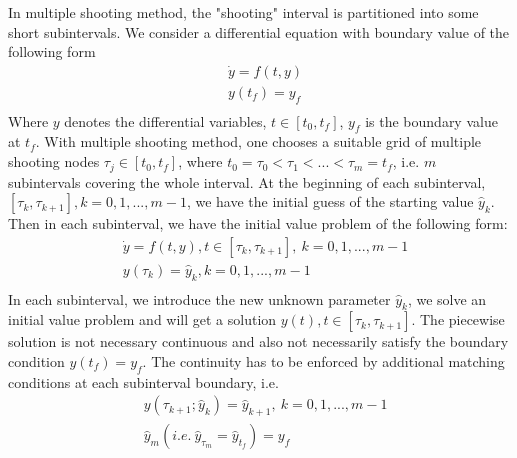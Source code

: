 \documentclass  [
  paper    = a4,
  BCOR     = 10mm,
  twoside,
  fontsize = 12pt,
  fleqn,
  toc      = bibnumbered,
  toc      = listofnumbered,
  numbers  = noendperiod,
  headings = normal,
  listof   = leveldown,
  version  = 3.03
]                                       {scrreprt}
\newcommand{\<}{\langle}
\renewcommand{\>}{\rangle}
\begin{document}
In multiple shooting method, the "shooting" interval is partitioned into some short subintervals. We consider a differential equation with boundary value of the following form
\begin{equation}\label{eqn:ori_dae}
	\begin{aligned}
		& \dot{y} = f(t, y) \\ 
		& y(t_f) = y_f  \\
	\end{aligned}
\end{equation}
Where $y$ denotes the differential variables, $t \in [t_0, t_f]$, $y_f$ is the boundary value at $t_f$. With multiple shooting method, one chooses a suitable grid of multiple shooting nodes $\tau_j \in [t_0,t_f] $, where $t_0 = \tau_0 < \tau_1 < ... < \tau_m = t_f$, i.e. $m$ subintervals covering the whole interval. At the beginning of each subinterval, $[\tau_k, \tau_{k+1}], k = 0, 1, ..., m-1$, we have the initial guess of the starting value $\hat{y}_k$. Then in each subinterval, we have the initial value problem of the following form: 
\begin{equation}\label{eqn:msh}
	\begin{aligned}
		& \dot{y} = f(t, y) , t \in [\tau_k, \tau_{k+1}], \ k = 0, 1, ..., m-1   \\ 
		& y(\tau_k) = \hat{y}_k, k = 0, 1, ..., m-1  \\
	\end{aligned}
\end{equation}
In each subinterval, we introduce the new unknown parameter $\hat{y}_k$, we solve an initial value problem and will get a solution $y(t), t \in [\tau_k, \tau_{k+1}]$. The piecewise solution is not necessary continuous and also not necessarily satisfy the boundary condition $y(t_f) = y_f$. The continuity has to be enforced by additional matching conditions at each subinterval boundary, i.e. 
\begin{equation}\label{eqn:mc}
	\begin{aligned}
		& y(\tau_{k+1}; \hat{y}_k) = \hat{y}_{k+1}, \  k = 0, 1, ..., m-1  \\
		& \hat{y}_{m} (i.e. \ \hat{y}_{\tau_m} = \hat{y}_{t_f}) =  y_f 
	\end{aligned}
\end{equation}
\end{document}
